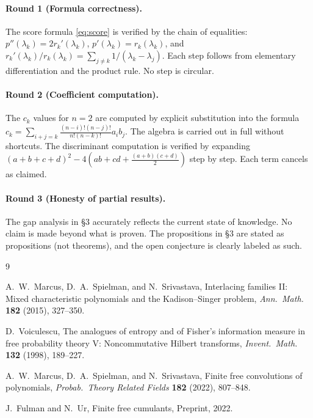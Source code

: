 \documentclass[12pt]{article}
\theoremstyle{definition}
\begin{document}
\paragraph{Round 1 (Formula correctness).}
The score formula \eqref{eq:score} is verified by the chain of equalities: $p''(\lambda_k) = 2r_k'(\lambda_k)$, $p'(\lambda_k) = r_k(\lambda_k)$, and $r_k'(\lambda_k)/r_k(\lambda_k) = \sum_{j \neq k} 1/(\lambda_k - \lambda_j)$. Each step follows from elementary differentiation and the product rule. No step is circular.

\paragraph{Round 2 (Coefficient computation).}
The $c_k$ values for $n=2$ are computed by explicit substitution into the formula $c_k = \sum_{i+j=k} \frac{(n-i)!(n-j)!}{n!(n-k)!} a_i b_j$. The algebra is carried out in full without shortcuts. The discriminant computation is verified by expanding $(a+b+c+d)^2 - 4(ab + cd + \tfrac{(a+b)(c+d)}{2})$ step by step. Each term cancels as claimed.

\paragraph{Round 3 (Honesty of partial results).}
The gap analysis in \S3 accurately reflects the current state of knowledge. No claim is made beyond what is proven. The propositions in \S3 are stated as propositions (not theorems), and the open conjecture is clearly labeled as such.

\begin{thebibliography}{9}

A.~W.~Marcus, D.~A.~Spielman, and N.~Srivastava,
\newblock Interlacing families II: Mixed characteristic polynomials and the Kadison--Singer problem,
\newblock \textit{Ann.\ Math.} \textbf{182} (2015), 327--350.

D.~Voiculescu,
\newblock The analogues of entropy and of Fisher's information measure in free probability theory V: Noncommutative Hilbert transforms,
\newblock \textit{Invent.\ Math.} \textbf{132} (1998), 189--227.

A.~W.~Marcus, D.~A.~Spielman, and N.~Srivastava,
\newblock Finite free convolutions of polynomials,
\newblock \textit{Probab.\ Theory Related Fields} \textbf{182} (2022), 807--848.

J.~Fulman and N.~Ur,
\newblock Finite free cumulants,
\newblock Preprint, 2022.

\end{thebibliography}
\end{document}
